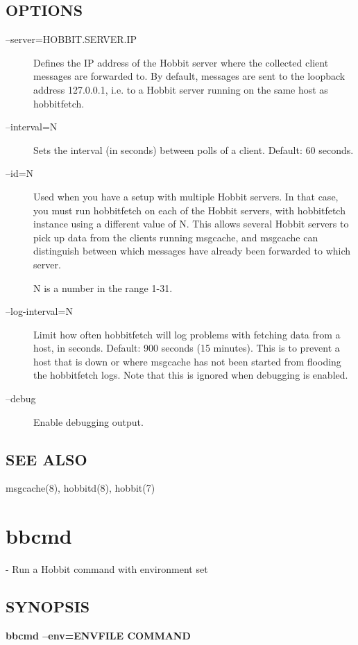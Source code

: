  
\subsection{OPTIONS}
\begin{description}
\item[--server=HOBBIT.SERVER.IP] Defines the IP address of the Hobbit
  server where the collected client messages are forwarded to. By
  default, messages are sent to the loopback address 127.0.0.1,
  i.e. to a Hobbit server running on the same host as hobbitfetch. 


 

\item[--interval=N] Sets the interval (in seconds) between polls of a client. Default: 60 seconds. 

 

\item[--id=N] Used when you have a setup with multiple Hobbit
 servers. In that case, you must run hobbitfetch on each of the Hobbit
 servers, with hobbitfetch instance using a different value of N. This
 allows several Hobbit servers to pick up data from the clients
 running msgcache, and msgcache can distinguish between which messages
 have already been forwarded to which server.  

 N is a number in the range 1-31. 

 

\item[--log-interval=N] Limit how often hobbitfetch will log problems
  with fetching data from a host, in seconds. Default: 900 seconds (15
  minutes). This is to prevent a host that is down or where msgcache
  has not been started from flooding the hobbitfetch logs. Note that
  this is ignored when debugging is enabled. 


 

\item[--debug] Enable debugging output. 

 


\end{description}
\subsection{SEE ALSO}
msgcache(8), hobbitd(8), hobbit(7) 

 
%
\newpage
\section{bbcmd}
  - Run a Hobbit command with environment set \subsection{SYNOPSIS}
\textbf{bbcmd --env=ENVFILE COMMAND}



